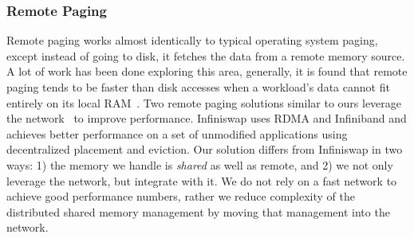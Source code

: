 


\subsubsection{Remote Paging}
Remote paging works almost identically to typical operating system paging, except instead of going to disk, it fetches the data from a remote memory source. A lot of work has been done exploring this area, generally, it is found that remote paging tends to be faster than disk accesses when a workload's data cannot fit entirely on its local RAM~\cite{infiniswap}. Two remote paging solutions similar to ours leverage the network~\cite{infiniswap, Liang2005} to improve performance. Infiniswap uses RDMA and Infiniband and achieves better performance on a set of unmodified applications using decentralized placement and eviction. Our solution differs from Infiniswap in two ways: 1) the memory we handle is \textit{shared} as well as remote, and 2) we not only leverage the network, but integrate with it. We do not rely on a fast network to achieve good performance numbers, rather we reduce complexity of the distributed shared memory management by moving that management into the network. 




